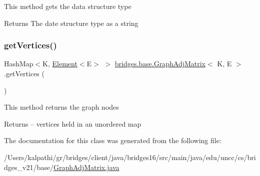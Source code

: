 This method gets the data structure type

\begin{DoxyReturn}{Returns}
The date structure type as a string 
\end{DoxyReturn}
\hypertarget{classbridges_1_1base_1_1_graph_adj_matrix_ac8270b3cbc4cf5f2f03c555ac6055423}{}\label{classbridges_1_1base_1_1_graph_adj_matrix_ac8270b3cbc4cf5f2f03c555ac6055423} 
\subsubsection{\texorpdfstring{get\+Vertices()}{getVertices()}}
{\footnotesize\ttfamily Hash\+Map$<$K, \hyperlink{classbridges_1_1base_1_1_element}{Element}$<$E$>$ $>$ \hyperlink{classbridges_1_1base_1_1_graph_adj_matrix}{bridges.\+base.\+Graph\+Adj\+Matrix}$<$ K, E $>$.get\+Vertices (\begin{DoxyParamCaption}{ }\end{DoxyParamCaption})}

This method returns the graph nodes

\begin{DoxyReturn}{Returns}
-- vertices held in an unordered map 
\end{DoxyReturn}


The documentation for this class was generated from the following file\+:\begin{DoxyCompactItemize}
\item 
/\+Users/kalpathi/gr/bridges/client/java/bridges16/src/main/java/edu/uncc/cs/bridges\+\_\+v21/base/\hyperlink{_graph_adj_matrix_8java}{Graph\+Adj\+Matrix.\+java}\end{DoxyCompactItemize}
